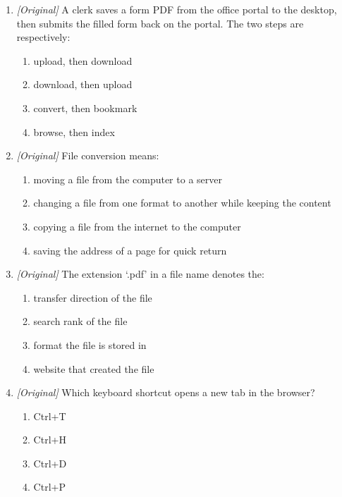 \documentclass[11pt]{article}
\begin{document}
\begin{enumerate}[label=\textbf{Q\arabic*.}, leftmargin=*]
\begin{enumerate}[label=\Alph*.]
    \item saving a web page for offline reading
    \item sending a file from the computer to the internet
    \item clearing the browsing history
  \end{enumerate}
\item \textit{[Original]} A clerk saves a form PDF from the office portal to
  the desktop, then submits the filled form back on the portal. The two steps
  are respectively:
  \begin{enumerate}[label=\Alph*.]
    \item upload, then download
    \item download, then upload
    \item convert, then bookmark
    \item browse, then index
  \end{enumerate}
\item \textit{[Original]} File conversion means:
  \begin{enumerate}[label=\Alph*.]
    \item moving a file from the computer to a server
    \item changing a file from one format to another while keeping the content
    \item copying a file from the internet to the computer
    \item saving the address of a page for quick return
  \end{enumerate}
\item \textit{[Original]} The extension `.pdf' in a file name denotes the:
  \begin{enumerate}[label=\Alph*.]
    \item transfer direction of the file
    \item search rank of the file
    \item format the file is stored in
    \item website that created the file
  \end{enumerate}
\item \textit{[Original]} Which keyboard shortcut opens a new tab in the
  browser?
  \begin{enumerate}[label=\Alph*.]
    \item Ctrl+T
    \item Ctrl+H
    \item Ctrl+D
    \item Ctrl+P
  \end{enumerate}

\end{enumerate}
\end{document}
